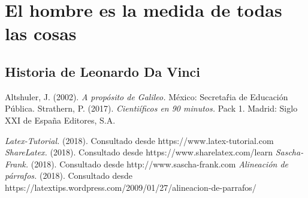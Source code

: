 \documentclass[letterpaper, 10pt, journal]{IEEEtran}
\begin{document}
\section{El hombre es la medida de todas las cosas}

\subsection{Historia de Leonardo Da Vinci}


\begin{thebibliography}{1}
\bibitem{[1]} Altshuler, J. (2002). \emph{A prop\'osito de Galileo.} M\'exico: Secretar\'́ia de Educaci\'on P\'ublica.
\bibitem{[2]} Strathern, P. (2017). \emph{Cienti\'ificos en 90 minutos.} Pack 1. Madrid: Siglo XXI de España Editores, S.A. 

 \emph{Latex-Tutorial.} (2018). Consultado desde https://www.latex-tutorial.com
 \emph{ShareLatex.} (2018). Consultado desde https://www.sharelatex.com/learn
 \emph{Sascha-Frank.} (2018). Consultado desde http://www.sascha-frank.com
\bibitem{[7]} \emph{Alineación de párrafos.} (2018). Consultado desde https://latextips.wordpress.com/2009/01/27/alineacion-de-parrafos/

\end{thebibliography}
\end{document}
